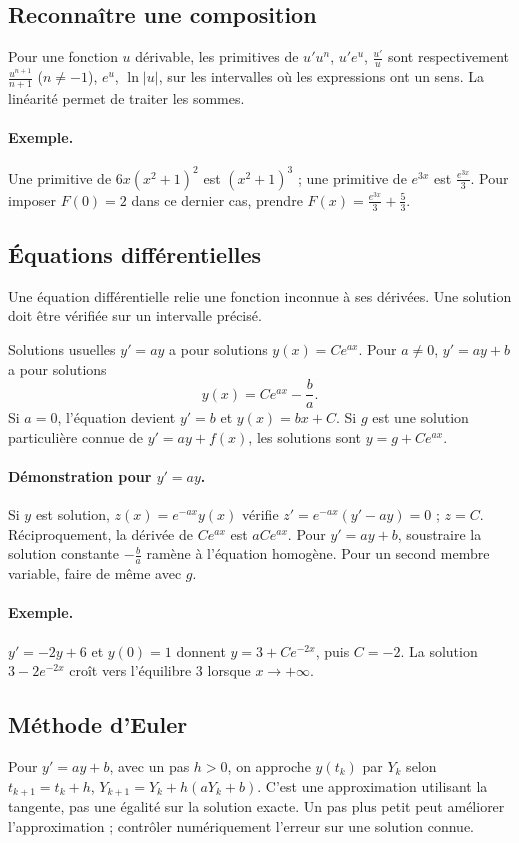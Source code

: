 \subsection{Reconnaître une composition}
Pour une fonction $u$ dérivable, les primitives de $u'u^n$, $u'e^u$, $\frac{u'}{u}$ sont respectivement $\frac{u^{n+1}}{n+1}$ ($n\ne-1$), $e^u$, $\ln|u|$, sur les intervalles où les expressions ont un sens. La linéarité permet de traiter les sommes.
\paragraph{Exemple.} Une primitive de $6x(x^2+1)^2$ est $(x^2+1)^3$ ; une primitive de $e^{3x}$ est $\frac{e^{3x}}{3}$. Pour imposer $F(0)=2$ dans ce dernier cas, prendre $F(x)=\frac{e^{3x}}{3}+\frac{5}{3}$.
\subsection{Équations différentielles}
Une équation différentielle relie une fonction inconnue à ses dérivées. Une solution doit être vérifiée sur un intervalle précisé.
\begin{retenir}{Solutions usuelles}
$y'=ay$ a pour solutions $y(x)=Ce^{ax}$. Pour $a\ne0$, $y'=ay+b$ a pour solutions
\[y(x)=Ce^{ax}-\frac ba.\]
Si $a=0$, l'équation devient $y'=b$ et $y(x)=bx+C$.
Si $g$ est une solution particulière connue de $y'=ay+f(x)$, les solutions sont $y=g+Ce^{ax}$.
\end{retenir}
\paragraph{Démonstration pour $y'=ay$.} Si $y$ est solution, $z(x)=e^{-ax}y(x)$ vérifie $z'=e^{-ax}(y'-ay)=0$ ; $z=C$. Réciproquement, la dérivée de $Ce^{ax}$ est $aCe^{ax}$. Pour $y'=ay+b$, soustraire la solution constante $-\frac{b}{a}$ ramène à l'équation homogène. Pour un second membre variable, faire de même avec $g$.
\paragraph{Exemple.} $y'=-2y+6$ et $y(0)=1$ donnent $y=3+Ce^{-2x}$, puis $C=-2$. La solution $3-2e^{-2x}$ croît vers l'équilibre $3$ lorsque $x\to+\infty$.
\subsection{Méthode d'Euler}
Pour $y'=ay+b$, avec un pas $h>0$, on approche $y(t_k)$ par $Y_k$ selon $t_{k+1}=t_k+h$, $Y_{k+1}=Y_k+h(aY_k+b)$. C'est une approximation utilisant la tangente, pas une égalité sur la solution exacte. Un pas plus petit peut améliorer l'approximation ; contrôler numériquement l'erreur sur une solution connue.


